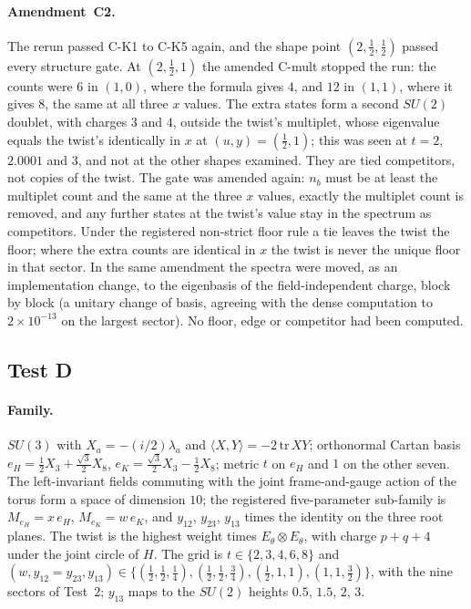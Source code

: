 \documentclass[11pt]{article}
\theoremstyle{definition}
\theoremstyle{remark}
\begin{document}
\paragraph{Amendment~C2.} The rerun passed C-K1 to C-K5 again, and the shape point $(2,\tfrac12,\tfrac12)$ passed every
structure gate. At $(2,\tfrac12,1)$ the amended C-mult stopped the run: the counts were $6$ in $(1,0)$, where the formula
gives $4$, and $12$ in $(1,1)$, where it gives $8$, the same at all three $x$ values. The extra states form a second
$SU(2)$ doublet, with charges $3$ and $4$, outside the twist's multiplet, whose eigenvalue equals the twist's identically
in $x$ at $(u,y)=(\tfrac12,1)$; this was seen at $t=2$, $2.0001$ and $3$, and not at the other shapes examined. They are
tied competitors, not copies of the twist. The gate was amended again: $n_b$ must be at least the multiplet count and the
same at the three $x$ values, exactly the multiplet count is removed, and any further states at the twist's value stay in
the spectrum as competitors. Under the registered non-strict floor rule a tie leaves the twist the floor; where the extra
counts are identical in $x$ the twist is never the unique floor in that sector. In the same amendment the spectra were
moved, as an implementation change, to the eigenbasis of the field-independent charge, block by block (a unitary change
of basis, agreeing with the dense computation to $2\times10^{-13}$ on the largest sector). No floor, edge or competitor
had been computed.

\subsection{Test D}

\paragraph{Family.} $SU(3)$ with $X_a=-(i/2)\lambda_a$ and $\langle X,Y\rangle=-2\,\mathrm{tr}\,XY$; orthonormal Cartan
basis $e_H=\tfrac12X_3+\tfrac{\sqrt3}2X_8$, $e_K=\tfrac{\sqrt3}2X_3-\tfrac12X_8$; metric $t$ on $e_H$ and $1$ on the other
seven. The left-invariant fields commuting with the joint frame-and-gauge action of the torus form a space of dimension
$10$; the registered five-parameter sub-family is $M_{e_H}=x\,e_H$, $M_{e_K}=w\,e_K$, and $y_{12}$, $y_{23}$, $y_{13}$
times the identity on the three root planes. The twist is the highest weight times $E_\theta\otimes E_\theta$, with charge
$p+q+4$ under the joint circle of $H$. The grid is $t\in\{2,3,4,6,8\}$ and
$(w,y_{12}=y_{23},y_{13})\in\{(\tfrac12,\tfrac12,\tfrac14),(\tfrac12,\tfrac12,\tfrac34),(\tfrac12,1,1),(1,1,\tfrac32)\}$,
with the nine sectors of Test~2; $y_{13}$ maps to the $SU(2)$ heights $0.5$, $1.5$, $2$, $3$.
\end{document}
